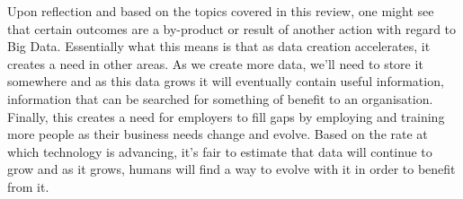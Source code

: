 \documentclass[10pt,journal,compsoc]{IEEEtran}
\begin{document}
Upon reflection and based on the topics covered in this review, one might see that certain outcomes are a by-product or result of another action with regard to Big Data. Essentially what this means is that as data creation accelerates, it creates a need in other areas. As we create more data, we’ll need to store it somewhere and as this data grows it will eventually contain useful information, information that can be searched for something of benefit to an organisation. Finally, this creates a need for employers to fill gaps by employing and training more people as their business needs change and evolve. Based on the rate at which technology is advancing, it's fair to estimate that data will continue to grow and as it grows, humans will find a way to evolve with it in order to benefit from it.
\end{document}
